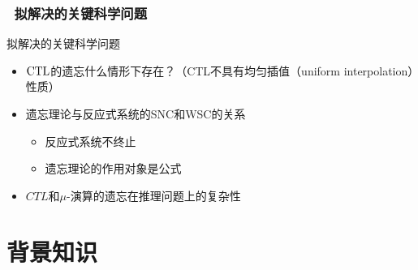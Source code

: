 \documentclass[9pt, CJK]{beamer}
\begin{document}
\begin{frame}
	\frametitle{~拟解决的关键科学问题}
{\footnotesize
	\begin{block}{拟解决的关键科学问题}
		\begin{itemize}
			\item  $\textrm{CTL}$的遗忘什么情形下存在？（CTL不具有均匀插值（uniform interpolation）性质）
			\item 遗忘理论与反应式系统的SNC和WSC的关系
			\begin{itemize}
				\item 反应式系统不终止
				\item 遗忘理论的作用对象是公式
			\end{itemize}
			\item $CTL$和$\mu$-演算的遗忘在推理问题上的复杂性
		\end{itemize}
	\end{block}
}
\end{frame}


\section{背景知识}
\end{document}
